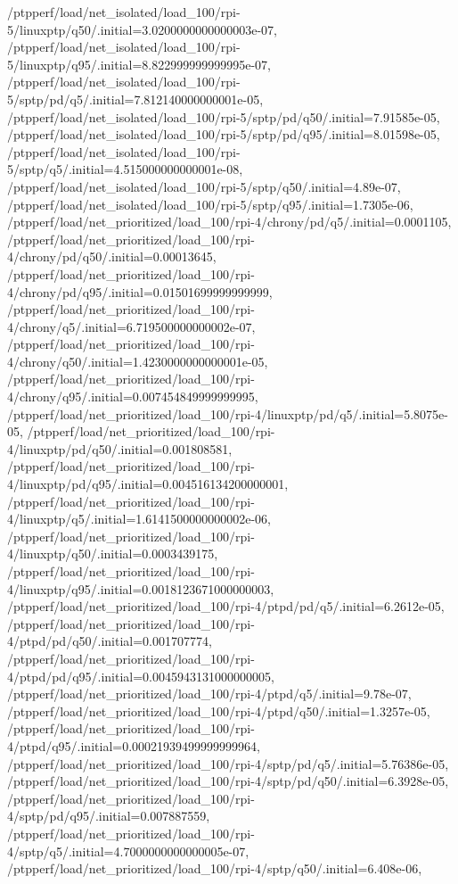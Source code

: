 {    /ptpperf/load/net_isolated/load_100/rpi-5/linuxptp/q50/.initial=3.0200000000000003e-07,
    /ptpperf/load/net_isolated/load_100/rpi-5/linuxptp/q95/.initial=8.822999999999995e-07,
    /ptpperf/load/net_isolated/load_100/rpi-5/sptp/pd/q5/.initial=7.812140000000001e-05,
    /ptpperf/load/net_isolated/load_100/rpi-5/sptp/pd/q50/.initial=7.91585e-05,
    /ptpperf/load/net_isolated/load_100/rpi-5/sptp/pd/q95/.initial=8.01598e-05,
    /ptpperf/load/net_isolated/load_100/rpi-5/sptp/q5/.initial=4.515000000000001e-08,
    /ptpperf/load/net_isolated/load_100/rpi-5/sptp/q50/.initial=4.89e-07,
    /ptpperf/load/net_isolated/load_100/rpi-5/sptp/q95/.initial=1.7305e-06,
    /ptpperf/load/net_prioritized/load_100/rpi-4/chrony/pd/q5/.initial=0.0001105,
    /ptpperf/load/net_prioritized/load_100/rpi-4/chrony/pd/q50/.initial=0.00013645,
    /ptpperf/load/net_prioritized/load_100/rpi-4/chrony/pd/q95/.initial=0.01501699999999999,
    /ptpperf/load/net_prioritized/load_100/rpi-4/chrony/q5/.initial=6.719500000000002e-07,
    /ptpperf/load/net_prioritized/load_100/rpi-4/chrony/q50/.initial=1.4230000000000001e-05,
    /ptpperf/load/net_prioritized/load_100/rpi-4/chrony/q95/.initial=0.007454849999999995,
    /ptpperf/load/net_prioritized/load_100/rpi-4/linuxptp/pd/q5/.initial=5.8075e-05,
    /ptpperf/load/net_prioritized/load_100/rpi-4/linuxptp/pd/q50/.initial=0.001808581,
    /ptpperf/load/net_prioritized/load_100/rpi-4/linuxptp/pd/q95/.initial=0.004516134200000001,
    /ptpperf/load/net_prioritized/load_100/rpi-4/linuxptp/q5/.initial=1.6141500000000002e-06,
    /ptpperf/load/net_prioritized/load_100/rpi-4/linuxptp/q50/.initial=0.0003439175,
    /ptpperf/load/net_prioritized/load_100/rpi-4/linuxptp/q95/.initial=0.0018123671000000003,
    /ptpperf/load/net_prioritized/load_100/rpi-4/ptpd/pd/q5/.initial=6.2612e-05,
    /ptpperf/load/net_prioritized/load_100/rpi-4/ptpd/pd/q50/.initial=0.001707774,
    /ptpperf/load/net_prioritized/load_100/rpi-4/ptpd/pd/q95/.initial=0.0045943131000000005,
    /ptpperf/load/net_prioritized/load_100/rpi-4/ptpd/q5/.initial=9.78e-07,
    /ptpperf/load/net_prioritized/load_100/rpi-4/ptpd/q50/.initial=1.3257e-05,
    /ptpperf/load/net_prioritized/load_100/rpi-4/ptpd/q95/.initial=0.00021939499999999964,
    /ptpperf/load/net_prioritized/load_100/rpi-4/sptp/pd/q5/.initial=5.76386e-05,
    /ptpperf/load/net_prioritized/load_100/rpi-4/sptp/pd/q50/.initial=6.3928e-05,
    /ptpperf/load/net_prioritized/load_100/rpi-4/sptp/pd/q95/.initial=0.007887559,
    /ptpperf/load/net_prioritized/load_100/rpi-4/sptp/q5/.initial=4.7000000000000005e-07,
    /ptpperf/load/net_prioritized/load_100/rpi-4/sptp/q50/.initial=6.408e-06,
}
